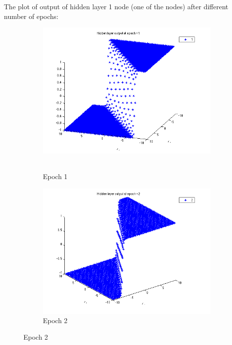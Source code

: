 \documentclass{article}
\begin{document}
The plot of output of hidden layer 1 node (one of the nodes) after different number of epochs:

\begin{figure}
\begin{subfigure}{.5\textwidth}
  \centering
  \includegraphics[width=.8\linewidth]{Regression/bivariate/hidden_2layer_1.png}\
  \caption{Epoch 1}
\end{subfigure}%
\begin{subfigure}{.5\textwidth}
  \centering
  \includegraphics[width=.8\linewidth]{Regression/bivariate/hidden_2layer_2.png}
   \caption{Epoch 2}
  \end{subfigure}
  

\end{figure}
\end{document}
